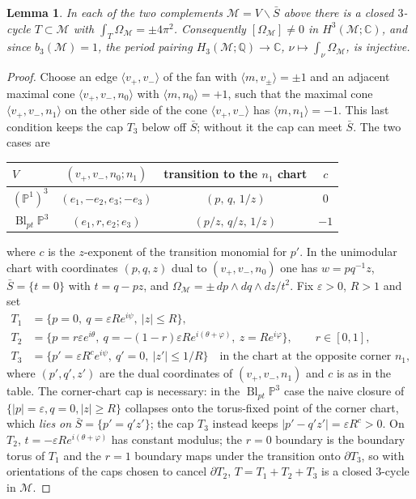 \documentclass[11pt]{amsart}
\newtheorem{lemma}[theorem]{Lemma}
\theoremstyle{definition}
\theoremstyle{remark}
\theoremstyle{plain}
\newcommand{\QQ}{\mathbb{Q}}
\newcommand{\CC}{\mathbb{C}}
\newcommand{\PP}{\mathbb{P}}
\newcommand{\Mil}{\mathcal{M}}  %
\newcommand{\Bl}{\operatorname{Bl}}
\newcommand{\Sb}{\bar{S}}
\begin{document}
\begin{lemma}\label{lem:D1}
In each of the two complements $\Mil=V\smallsetminus\Sb$ above there is a
closed $3$-cycle $T\subset \Mil$ with $\int_T\Omega_\Mil=\pm4\pi^2$.
Consequently $[\Omega_\Mil]\neq0$ in $H^3(\Mil;\CC)$, and since
$b_3(\Mil)=1$, the period pairing
$H_3(\Mil;\QQ)\to\CC$, $\nu\mapsto\int_\nu\Omega_\Mil$, is injective.
\end{lemma}

\begin{proof}
Choose an edge $\langle v_+,v_-\rangle$ of the fan with
$\langle m,v_\pm\rangle=\pm1$ and an adjacent maximal cone
$\langle v_+,v_-,n_0\rangle$ with $\langle m,n_0\rangle=+1$, such that the
maximal cone $\langle v_+,v_-,n_1\rangle$ on the other side of the cone
$\langle v_+,v_-\rangle$ has $\langle m,n_1\rangle=-1$.  This last condition
keeps the cap $T_3$ below off $\Sb$; without it the cap can meet $\Sb$.  The
two cases are
\begin{center}
\begin{tabular}{lccc}
\toprule
$V$ & $(v_+,v_-,n_0;n_1)$ & transition to the $n_1$ chart & $c$\\
\midrule
$(\PP^1)^3$ & $(e_1,-e_2,e_3;-e_3)$ & $(p,\,q,\,1/z)$ & $0$\\
$\Bl_{pt}\PP^3$ & $(e_1,r,e_2;e_3)$ & $(p/z,\,q/z,\,1/z)$ & $-1$\\
\bottomrule
\end{tabular}
\end{center}
where $c$ is the $z$-exponent of the transition monomial for $p'$.  In the
unimodular chart with coordinates $(p,q,z)$ dual to $(v_+,v_-,n_0)$ one has
$w=pq^{-1}z$, $\Sb=\{t=0\}$ with $t=q-pz$, and
$\Omega_\Mil=\pm\,dp\wedge dq\wedge dz/t^{2}$.
Fix $\varepsilon>0$, $R>1$ and set
\begin{align*}
T_1&=\{p=0,\ q=\varepsilon Re^{i\psi},\ |z|\le R\},\\
T_2&=\{p=r\varepsilon e^{i\theta},\
q=-(1-r)\varepsilon Re^{i(\theta+\varphi)},\
z=Re^{i\varphi}\},\qquad r\in[0,1],\\
T_3&=\{p'=\varepsilon R^{c}e^{i\psi},\ q'=0,\ |z'|\le 1/R\}
\quad\text{in the chart at the opposite corner }n_1,
\end{align*}
where $(p',q',z')$ are the dual coordinates of $(v_+,v_-,n_1)$ and $c$ is as in
the table.  The corner-chart cap is necessary: in the
$\Bl_{pt}\PP^3$ case the naive closure of
$\{|p|=\varepsilon,q=0,|z|\ge R\}$ collapses onto the torus-fixed
point of the corner chart, which \emph{lies on} $\Sb=\{p'=q'z'\}$;
the cap $T_3$ instead keeps $|p'-q'z'|=\varepsilon R^{c}>0$.  On
$T_2$, $t=-\varepsilon Re^{i(\theta+\varphi)}$ has
constant modulus; the $r=0$ boundary is the boundary torus of $T_1$
and the $r=1$ boundary maps under the transition onto
$\partial T_3$, so with orientations of the caps chosen to cancel
$\partial T_2$, $T=T_1+T_2+T_3$ is a closed $3$-cycle in $\Mil$.


\end{proof}
\end{document}
